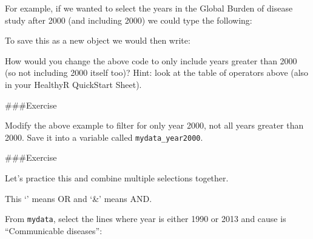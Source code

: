 \documentclass[]{book}
\makeatletter
\newenvironment{Shaded}{\begin{snugshade}}{\end{snugshade}}
\newcommand{\CommentTok}[1]{\textcolor[rgb]{0.56,0.35,0.01}{\textit{#1}}}
\newcommand{\DecValTok}[1]{\textcolor[rgb]{0.00,0.00,0.81}{#1}}
\newcommand{\KeywordTok}[1]{\textcolor[rgb]{0.13,0.29,0.53}{\textbf{#1}}}
\newcommand{\NormalTok}[1]{#1}
\newcommand{\OperatorTok}[1]{\textcolor[rgb]{0.81,0.36,0.00}{\textbf{#1}}}
\newcommand{\StringTok}[1]{\textcolor[rgb]{0.31,0.60,0.02}{#1}}
\newenvironment{kframe}{%
\medskip{}
\setlength{\fboxsep}{.8em}
 \def\at@end@of@kframe{}%
 \ifinner\ifhmode%
  \def\at@end@of@kframe{\end{minipage}}%
  \begin{minipage}{\columnwidth}%
 \fi\fi%
 \def\FrameCommand##1{\hskip\@totalleftmargin \hskip-\fboxsep
 \colorbox{shadecolor}{##1}\hskip-\fboxsep
     \hskip-\linewidth \hskip-\@totalleftmargin \hskip\columnwidth}%
 \MakeFramed {\advance\hsize-\width
   \@totalleftmargin\z@ \linewidth\hsize
   \@setminipage}}%
 {\par\unskip\endMakeFramed%
 \at@end@of@kframe}
\renewenvironment{Shaded}{\begin{kframe}}{\end{kframe}}
\theoremstyle{definition}
\theoremstyle{definition}
\theoremstyle{definition}
\theoremstyle{remark}
\makeatother
\begin{document}
For example, if we wanted to select the years in the Global Burden of
disease study after 2000 (and including 2000) we could type the
following:

\begin{Shaded}
\end{Shaded}

To save this as a new object we would then write:

\begin{Shaded}
\end{Shaded}

How would you change the above code to only include years greater than
2000 (so not including 2000 itself too)? Hint: look at the table of
operators above (also in your HealthyR QuickStart Sheet).

\#\#\#Exercise

Modify the above example to filter for only year 2000, not all years
greater than 2000. Save it into a variable called
\texttt{mydata\_year2000}.

\#\#\#Exercise

Let's practice this and combine multiple selections together.

This `\textbar{}' means OR and `\&' means AND.

From \texttt{mydata}, select the lines where year is either 1990 or 2013
and cause is ``Communicable diseases'':
\end{document}
